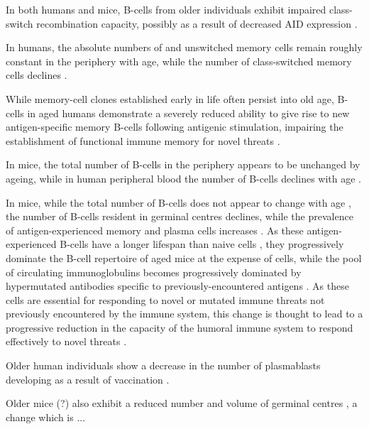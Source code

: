 In both humans and mice, B-cells from older individuals exhibit impaired class-switch recombination capacity, possibly as a result of decreased AID expression \parencite{montecino2013immunosenescence,blomberg2013age}.

In humans, the absolute numbers of \naive and unswitched memory cells remain roughly constant in the periphery with age, while the number of class-switched memory cells declines \parencite{blomberg2013age}.

While memory-cell clones established early in life often persist into old age, \naive B-cells in aged humans demonstrate a severely reduced ability to give rise to new antigen-specific memory B-cells following antigenic stimulation, impairing the establishment of functional immune memory for novel threats \parencite{aberle2013mechanistic}.

In mice, the total number of B-cells in the periphery appears to be unchanged by ageing, while in human peripheral blood the number of B-cells declines with age \parencite{montecino2013immunosenescence,aberle2013mechanistic}. 

In mice, while the total number of B-cells does not appear to change with age \parencite{montecino2013immunosenescence}, the number of \naive B-cells resident in germinal centres declines, while the prevalence of antigen-experienced memory and plasma cells increases \parencite{mehr2011reversing,kogut2012bcells}. As these antigen-experienced B-cells have a longer lifespan than naive cells \parencite{kogut2012bcells}, they progressively dominate the B-cell repertoire of aged mice at the expense of \naive cells, while the pool of circulating immunoglobulins becomes progressively dominated by hypermutated antibodies specific to previously-encountered antigens \parencite{kogut2012bcells}. As these \naive cells are essential for responding to novel or mutated immune threats not previously encountered by the immune system, this change is thought to lead to a progressive reduction in the capacity of the humoral immune system to respond effectively to novel threats \parencite{kogut2012bcells}.



Older human individuals show a decrease in the number of plasmablasts developing as a result of vaccination \parencite{montecino2013immunosenescence}.

Older mice (?) also exhibit a reduced number and volume of germinal centres \parencite{mehr2011reversing}, a change which is ...

